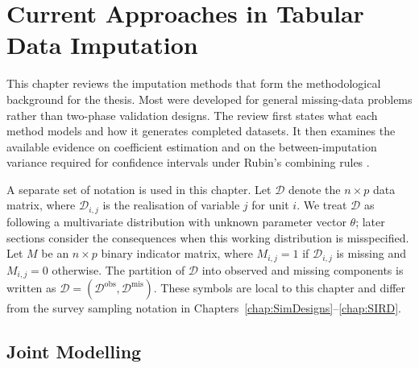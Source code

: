 \chapter{Current Approaches in Tabular Data Imputation}
\label{chap:ImpReview}

This chapter reviews the imputation methods that form the methodological background for the thesis. Most were developed for general missing-data problems rather than two-phase validation designs. The review first states what each method models and how it generates completed datasets. It then examines the available evidence on coefficient estimation and on the between-imputation variance required for confidence intervals under Rubin's combining rules \citep{Rubin1987}.

A separate set of notation is used in this chapter. Let $\mathcal{D}$ denote the $n \times p$ data matrix, where $\mathcal{D}_{i,j}$ is the realisation of variable $j$ for unit $i$. We treat $\mathcal{D}$ as following a multivariate distribution with unknown parameter vector $\theta$; later sections consider the consequences when this working distribution is misspecified. Let $M$ be an $n \times p$ binary indicator matrix, where $M_{i,j} = 1$ if $\mathcal{D}_{i,j}$ is missing and $M_{i,j} = 0$ otherwise. The partition of $\mathcal{D}$ into observed and missing components is written as $\mathcal{D} = (\mathcal{D}^{\mathrm{obs}}, \mathcal{D}^{\mathrm{mis}})$. These symbols are local to this chapter and differ from the survey sampling notation in Chapters~\ref{chap:SimDesigns}--\ref{chap:SIRD}.


\section{Joint Modelling}
\label{sec:joint}

